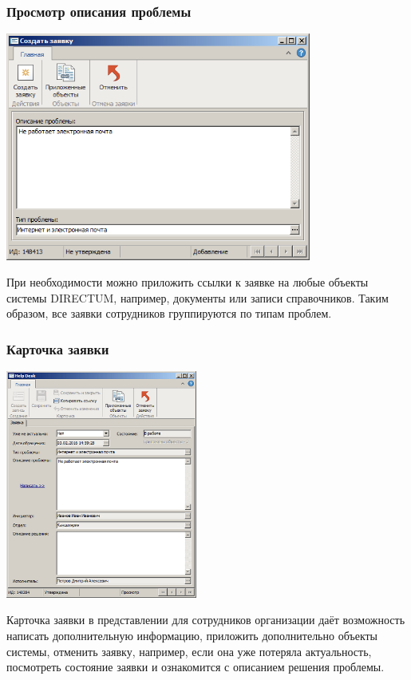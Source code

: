 \documentclass{../industrial-development}
\begin{document}
\begin{frame} \frametitle{Просмотр описания проблемы}
\centerline{\includegraphics[height=7.5cm]{pic3.png}}
\end{frame}
\lecturenotes
При необходимости можно приложить ссылки к заявке на любые объекты системы DIRECTUM, например, документы или записи справочников. Таким образом, все заявки сотрудников группируются по типам проблем.

\begin{frame} \frametitle{Карточка заявки}
\centerline{\includegraphics[height=7.5cm]{pic4.png}}
\end{frame}
\lecturenotes
Карточка заявки в представлении для сотрудников организации даёт возможность написать дополнительную информацию, приложить дополнительно объекты системы, отменить заявку, например, если она уже потеряла актуальность, посмотреть состояние заявки и ознакомится с описанием решения проблемы.
\end{document}

